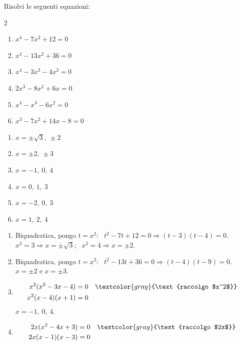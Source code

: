 \begin{question}[ID=4.4, subtitle={Equazioni di grado superiore al secondo}, difficulty=media, tags={equazioni di grado superiore}]
Risolvi le seguenti equazioni:
\begin{multicols}{2}
\begin{enumerate}[leftmargin=3cm]
    \item $x^4 - 7x^2 + 12 = 0$
    \item $x^4 - 13x^2 + 36 = 0$
    \item $x^4 - 3x^3 - 4x^2 = 0$
    \item $2x^3 - 8x^2 + 6x = 0$
    \item $x^4 - x^3 - 6x^2 = 0$
    \item $x^3 - 7x^2 + 14x - 8 = 0$
\end{enumerate}
\end{multicols}
\begin{solution}
\begin{enumerate}
    \item $x=\pm\sqrt3,\ \pm2$
    \item $x=\pm2,\ \pm3$
    \item $x=-1,\ 0,\ 4$
    \item $x=0,\ 1,\ 3$
    \item $x=-2,\ 0,\ 3$
    \item $x=1,\ 2,\ 4$
\end{enumerate}
\end{solution}
\begin{explanation}
\begin{enumerate}
    \item Biquadratica, pongo $t=x^2$: \ $t^2-7t+12=0 \Rightarrow (t-3)(t-4)=0$. \\
    $x^2=3 \Rightarrow x=\pm\sqrt3$; \ $x^2=4 \Rightarrow x=\pm2$.
    \item Biquadratica, pongo $t=x^2$: \ $t^2-13t+36=0 \Rightarrow (t-4)(t-9)=0$. \\
    $x=\pm2$ e $x=\pm3$.
    \item \[\begin{aligned}
    x^2(x^2-3x-4) &= 0 && \textcolor{gray}{\text{raccolgo $x^2$}}\\
    x^2(x-4)(x+1) &= 0
    \end{aligned}\]
    $x=-1,\ 0,\ 4$.
    \item \[\begin{aligned}
    2x(x^2-4x+3) &= 0 && \textcolor{gray}{\text{raccolgo $2x$}}\\
    2x(x-1)(x-3) &= 0

\end{aligned}\]
\end{enumerate}
\end{explanation}
\end{question}
